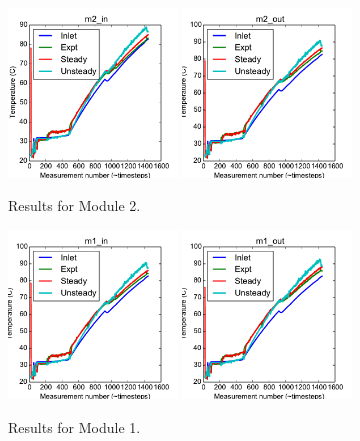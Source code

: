 \documentclass{article}
\begin{document}
\clearpage
\begin{figure}[!ht]
\centering
\includegraphics[width=0.4\textwidth]{../../data/ICSolar/images/Mar06_m2_in_compare.pdf}\hspace{0.05\textwidth}
\includegraphics[width=0.4\textwidth]{../../data/ICSolar/images/Mar06_m2_out_compare.pdf}\hspace{0.05\textwidth}\\
\caption{Results for Module 2.}\end{figure}
\begin{figure}[!ht]
\centering
\includegraphics[width=0.4\textwidth]{../../data/ICSolar/images/Mar06_m1_in_compare.pdf}\hspace{0.05\textwidth}
\includegraphics[width=0.4\textwidth]{../../data/ICSolar/images/Mar06_m1_out_compare.pdf}\hspace{0.05\textwidth}\\
\caption{Results for Module 1.}\end{figure}
\end{document}
